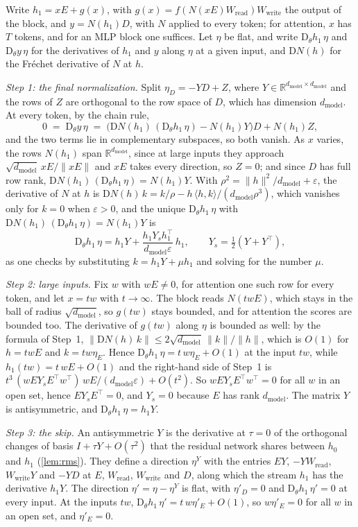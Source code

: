 \documentclass[10pt]{article}
\theoremstyle{definition}
\theoremstyle{remark}
\newcommand{\R}{\mathbb{R}}
\newcommand{\Wread}{W_{\mathrm{read}}}
\newcommand{\Wwrite}{W_{\mathrm{write}}}
\newcommand{\dm}{d_{\mathrm{model}}}
\newcommand{\Der}{\mathrm{D}}
\newcommand{\norm}[1]{\lVert #1\rVert}
\begin{document}
Write $h_1 = xE + g(x)$, with $g(x) = f(N(xE)\Wread)\Wwrite$ the output of the block, and $y = N(h_1)D$, with $N$ applied to every token; for attention, $x$ has $T$ tokens, and for an MLP block one suffices. Let $\eta$ be flat, and write $\Der_\theta h_1\,\eta$ and $\Der_\theta y\,\eta$ for the derivatives of $h_1$ and $y$ along $\eta$ at a given input, and $\Der N(h)$ for the Fr\'echet derivative of $N$ at $h$.

\emph{Step 1: the final normalization.} Split $\eta_D = -YD + Z$, where $Y \in \R^{\dm\times\dm}$ and the rows of $Z$ are orthogonal to the row space of $D$, which has dimension $\dm$. At every token, by the chain rule,
\[
0 \;=\; \Der_\theta y\,\eta \;=\; \big(\Der N(h_1)\,(\Der_\theta h_1\,\eta) - N(h_1)Y\big)D + N(h_1)Z,
\]
and the two terms lie in complementary subspaces, so both vanish. As $x$ varies, the rows $N(h_1)$ span $\R^{\dm}$, since at large inputs they approach $\sqrt{\dm}\,xE/\norm{xE}$ and $xE$ takes every direction, so $Z = 0$; and since $D$ has full row rank, $\Der N(h_1)\,(\Der_\theta h_1\,\eta) = N(h_1)Y$. With $\rho^2 = \norm{h}^2/\dm + \varepsilon$, the derivative of $N$ at $h$ is $\Der N(h)\,k = k/\rho - h\,\langle h, k\rangle/(\dm\rho^3)$, which vanishes only for $k = 0$ when $\varepsilon > 0$, and the unique $\Der_\theta h_1\,\eta$ with $\Der N(h_1)\,(\Der_\theta h_1\,\eta) = N(h_1)Y$ is
\[
\Der_\theta h_1\,\eta = h_1Y + \frac{h_1Y_sh_1^\top}{\dm\varepsilon}\,h_1, \qquad Y_s = \tfrac12(Y + Y^\top),
\]
as one checks by substituting $k = h_1Y + \mu h_1$ and solving for the number $\mu$.

\emph{Step 2: large inputs.} Fix $w$ with $wE \neq 0$, for attention one such row for every token, and let $x = tw$ with $t \to \infty$. The block reads $N(twE)$, which stays in the ball of radius $\sqrt{\dm}$, so $g(tw)$ stays bounded, and for attention the scores are bounded too. The derivative of $g(tw)$ along $\eta$ is bounded as well: by the formula of Step~1, $\norm{\Der N(h)\,k} \le 2\sqrt{\dm}\,\norm{k}/\norm{h}$, which is $O(1)$ for $h = twE$ and $k = tw\eta_E$. Hence $\Der_\theta h_1\,\eta = t\,w\eta_E + O(1)$ at the input $tw$, while $h_1(tw) = t\,wE + O(1)$ and the right-hand side of Step~1 is $t^3\,(wEY_sE^\top w^\top)\,wE/(\dm\varepsilon) + O(t^2)$. So $wEY_sE^\top w^\top = 0$ for all $w$ in an open set, hence $EY_sE^\top = 0$, and $Y_s = 0$ because $E$ has rank $\dm$. The matrix $Y$ is antisymmetric, and $\Der_\theta h_1\,\eta = h_1Y$.

\emph{Step 3: the skip.} An antisymmetric $Y$ is the derivative at $\tau = 0$ of the orthogonal changes of basis $I + \tau Y + O(\tau^2)$ that the residual network shares between $h_0$ and $h_1$ (\cref{lem:rms}). They define a direction $\eta^Y$ with the entries $EY$, $-Y\Wread$, $\Wwrite Y$ and $-YD$ at $E$, $\Wread$, $\Wwrite$ and $D$, along which the stream $h_1$ has the derivative $h_1Y$. The direction $\eta' = \eta - \eta^Y$ is flat, with $\eta'_D = 0$ and $\Der_\theta h_1\,\eta' = 0$ at every input. At the inputs $tw$, $\Der_\theta h_1\,\eta' = t\,w\eta'_E + O(1)$, so $w\eta'_E = 0$ for all $w$ in an open set, and $\eta'_E = 0$.
\end{document}
